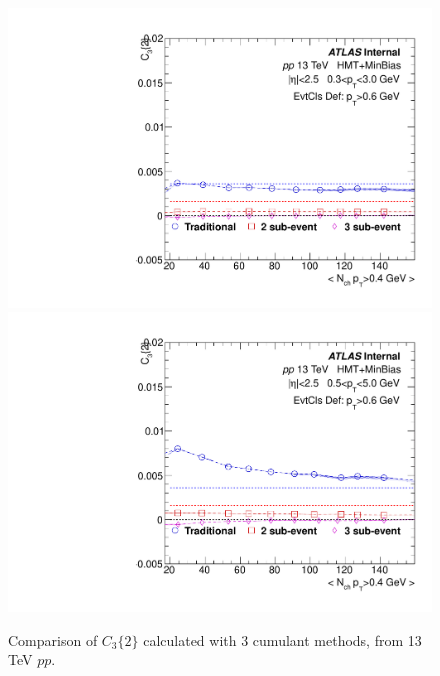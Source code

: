 \begin{figure}[p]
\includegraphics[width=0.4\linewidth]{figs/sec_result/pp13/phy_2PC_Har1_Pt0_Cls3.pdf}
\includegraphics[width=0.4\linewidth]{figs/sec_result/pp13/phy_2PC_Har1_Pt1_Cls3.pdf}
\caption{Comparison of $C_{3}\{2\}$ calculated with 3 cumulant methods, from 13 TeV $pp$.}
\label{fig:result_pp13_C32}
\end{figure}
\clearpage

